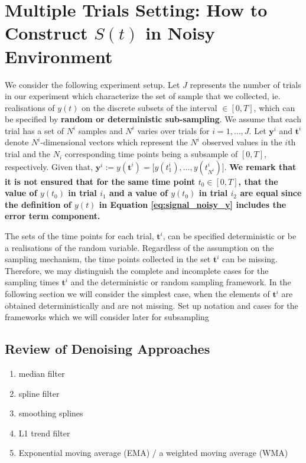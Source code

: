 \section{Multiple Trials Setting: How to Construct $S(t)$ in Noisy Environment}\label{sec:multiple_trials_setting}
We consider the following experiment setup. Let $J$ represents the number of trials in our experiment which characterize the set of sample that we collected, ie. realisations of $y(t)$ on the discrete subsets of the interval $ \in [0,T]$, which can be specified by \textbf{random or deterministic sub-sampling}. We assume that each trial has a set of $N^i$ samples and $N^i$ varies over trials for $i = 1,\ldots, J$. Let  $\mathbf{y}^{i}$ and $\mathbf{t}^i$ denote $N^i$-dimensional vectors which represent the $N^i$ observed values in the $i$th trial and the $N_i$ corresponding time points being a subsample of $[0,T]$, respectively. Given that, $\mathbf{y}^{i} := y(\mathbf{t}^i) = \big[y(t_1^i), \ldots, y(t_{N^i}^i) \big]$. \textbf{We remark that it is not ensured that for the same time point $t_0\in [0,T]$, that the value of $y(t_0)$ in trial $i_1$ and a value of $y(t_0)$ in trial $i_2$ are equal since the definition of $y(t)$ in Equation \eqref{eq:signal_noisy_y} includes the error term component.}


The sets of the time points for each trial, $\mathbf{t}^i$, can be specified deterministic or be a realisations of the random variable. Regardless of the assumption on the sampling mechanism, the time points collected in the set $\mathbf{t}^i$ can be missing. Therefore, we may distinguish the complete and incomplete cases for the sampling times $\mathbf{t}^i$ and the deterministic or random sampling framework. In the following section we will consider the simplest case, when the elements of  $\mathbf{t}^i$  are obtained deterministically and are not missing. {\color{red} Set up notation and cases for the frameworks which we will consider later for subsampling}

\subsection{Review of Denoising Approaches}
\begin{enumerate}
\item median filter
\item spline filter
\item smoothing splines
\item L1 trend filter
\item Exponential moving average (EMA) / a weighted moving average (WMA)
\end{enumerate}

